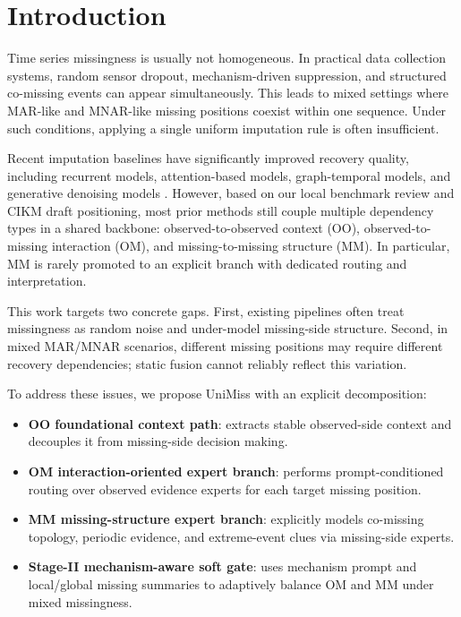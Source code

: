 \section{Introduction}

Time series missingness is usually not homogeneous. In practical data collection systems, random sensor dropout, mechanism-driven suppression, and structured co-missing events can appear simultaneously. This leads to mixed settings where MAR-like and MNAR-like missing positions coexist within one sequence. Under such conditions, applying a single uniform imputation rule is often insufficient.

Recent imputation baselines have significantly improved recovery quality, including recurrent models, attention-based models, graph-temporal models, and generative denoising models \cite{cao2018brits,du2023saits,liu2024imputeformer,marisca2022spin,wu2023timesnet,chen2024fgti,liu2024mtsci}. However, based on our local benchmark review and CIKM draft positioning, most prior methods still couple multiple dependency types in a shared backbone: observed-to-observed context (OO), observed-to-missing interaction (OM), and missing-to-missing structure (MM). In particular, MM is rarely promoted to an explicit branch with dedicated routing and interpretation.

This work targets two concrete gaps. First, existing pipelines often treat missingness as random noise and under-model missing-side structure. Second, in mixed MAR/MNAR scenarios, different missing positions may require different recovery dependencies; static fusion cannot reliably reflect this variation.

To address these issues, we propose UniMiss with an explicit decomposition:
\begin{itemize}
\item \textbf{OO foundational context path}: extracts stable observed-side context and decouples it from missing-side decision making.
\item \textbf{OM interaction-oriented expert branch}: performs prompt-conditioned routing over observed evidence experts for each target missing position.
\item \textbf{MM missing-structure expert branch}: explicitly models co-missing topology, periodic evidence, and extreme-event clues via missing-side experts.
\item \textbf{Stage-II mechanism-aware soft gate}: uses mechanism prompt and local/global missing summaries to adaptively balance OM and MM under mixed missingness.
\end{itemize}

